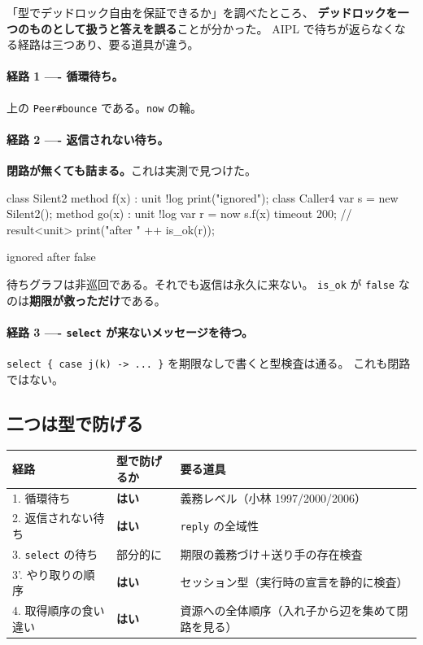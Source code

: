 \documentclass[11pt,a4paper]{ltjsarticle}
\theoremstyle{definition}
\theoremstyle{remark}
\begin{document}
「型でデッドロック自由を保証できるか」を調べたところ、
\textbf{デッドロックを一つのものとして扱うと答えを誤る}ことが分かった。
AIPL で待ちが返らなくなる経路は三つあり、要る道具が違う。

\paragraph{経路 1 ---- 循環待ち。}
上の \texttt{Peer\#bounce} である。\texttt{now} の輪。

\paragraph{経路 2 ---- 返信されない待ち。}
\textbf{閉路が無くても詰まる。}これは実測で見つけた。

\begin{aipl}
class Silent2 { method f(x) : unit !{log} { print("ignored"); } }
class Caller4 {
  var s = new Silent2();
  method go(x) : unit !{log} {
    var r = now s.f(x) timeout 200;      // result<unit>
    print("after " ++ is_ok(r));
  }
}
\end{aipl}
\begin{term}
ignored
after false
\end{term}

待ちグラフは非巡回である。それでも返信は永久に来ない。
\texttt{is\_ok} が \texttt{false} なのは\textbf{期限が救っただけ}である。

\paragraph{経路 3 ---- \texttt{select} が来ないメッセージを待つ。}
\texttt{select \{ case j(k) -> ... \}} を期限なしで書くと型検査は通る。
これも閉路ではない。

\subsection{二つは型で防げる}

\begin{center}
\begin{tabular}{lll}
\toprule
経路 & 型で防げるか & 要る道具 \\
\midrule
1. 循環待ち & \textbf{はい} & 義務レベル（小林 1997/2000/2006） \\
2. 返信されない待ち & \textbf{はい} & \texttt{reply} の全域性 \\
3. \texttt{select} の待ち & 部分的に & 期限の義務づけ＋送り手の存在検査 \\
3'. やり取りの順序 & \textbf{はい} & セッション型（実行時の宣言を静的に検査） \\
4. 取得順序の食い違い & \textbf{はい} & 資源への全体順序（入れ子から辺を集めて閉路を見る） \\
\bottomrule
\end{tabular}
\end{center}
\end{document}
